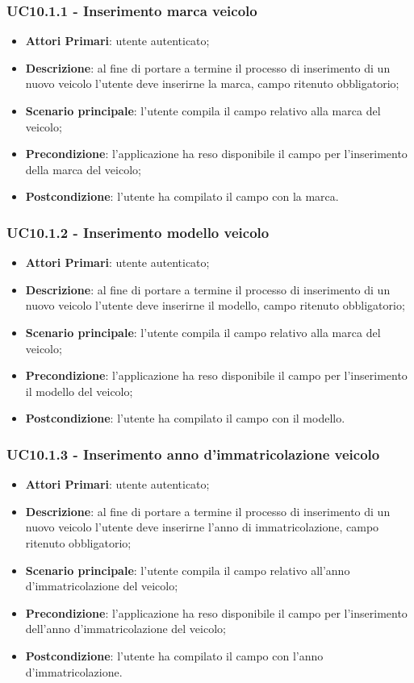 \subsubsection{UC10.1.1 - Inserimento marca veicolo}
\begin{itemize}
	\item \textbf{Attori Primari}: utente autenticato;
	\item \textbf{Descrizione}: al fine di portare a termine il processo di inserimento di un nuovo veicolo l'utente deve inserirne la marca, campo ritenuto obbligatorio;
	\item \textbf{Scenario principale}: l'utente compila il campo relativo alla marca del veicolo;	
	\item \textbf{Precondizione}: l'applicazione ha reso disponibile il campo per l'inserimento della marca del veicolo;
	\item \textbf{Postcondizione}: l'utente ha compilato il campo con la marca.	
\end{itemize}

\subsubsection{UC10.1.2 - Inserimento modello veicolo}
\begin{itemize}
	\item \textbf{Attori Primari}: utente autenticato;
	\item \textbf{Descrizione}: al fine di portare a termine il processo di inserimento di un nuovo veicolo l'utente deve inserirne il modello, campo ritenuto obbligatorio;
	\item \textbf{Scenario principale}: l'utente compila il campo relativo alla marca del veicolo;	
	\item \textbf{Precondizione}: l'applicazione ha reso disponibile il campo per l'inserimento il modello del veicolo;
	\item \textbf{Postcondizione}: l'utente ha compilato il campo con il modello.	
\end{itemize}

\subsubsection{UC10.1.3 - Inserimento anno d'immatricolazione veicolo}
\begin{itemize}
	\item \textbf{Attori Primari}: utente autenticato;
	\item \textbf{Descrizione}: al fine di portare a termine il processo di inserimento di un nuovo veicolo l'utente deve inserirne l'anno di immatricolazione, campo ritenuto obbligatorio;
	\item \textbf{Scenario principale}: l'utente compila il campo relativo all'anno d'immatricolazione del veicolo;	
	\item \textbf{Precondizione}: l'applicazione ha reso disponibile il campo per l'inserimento dell'anno d'immatricolazione del veicolo;
	\item \textbf{Postcondizione}: l'utente ha compilato il campo con l'anno d'immatricolazione.	
\end{itemize}

